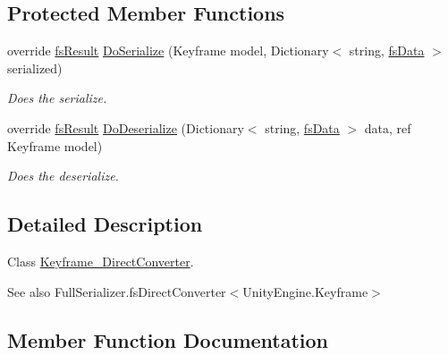 \subsection*{Protected Member Functions}
\begin{DoxyCompactItemize}
\item 
override \hyperlink{struct_full_serializer_1_1fs_result}{fs\+Result} \hyperlink{class_full_serializer_1_1_internal_1_1_direct_converters_1_1_keyframe___direct_converter_af16890a5241dfeb04a749245f64dd859}{Do\+Serialize} (Keyframe model, Dictionary$<$ string, \hyperlink{class_full_serializer_1_1fs_data}{fs\+Data} $>$ serialized)
\begin{DoxyCompactList}\small\item\em Does the serialize. \end{DoxyCompactList}\item 
override \hyperlink{struct_full_serializer_1_1fs_result}{fs\+Result} \hyperlink{class_full_serializer_1_1_internal_1_1_direct_converters_1_1_keyframe___direct_converter_a42df774ee6b28aa10dd727040969154b}{Do\+Deserialize} (Dictionary$<$ string, \hyperlink{class_full_serializer_1_1fs_data}{fs\+Data} $>$ data, ref Keyframe model)
\begin{DoxyCompactList}\small\item\em Does the deserialize. \end{DoxyCompactList}\end{DoxyCompactItemize}


\subsection{Detailed Description}
Class \hyperlink{class_full_serializer_1_1_internal_1_1_direct_converters_1_1_keyframe___direct_converter}{Keyframe\+\_\+\+Direct\+Converter}. 

\begin{DoxySeeAlso}{See also}
Full\+Serializer.\+fs\+Direct\+Converter$<$\+Unity\+Engine.\+Keyframe$>$


\end{DoxySeeAlso}


\subsection{Member Function Documentation}
\mbox{\label{class_full_serializer_1_1_internal_1_1_direct_converters_1_1_keyframe___direct_converter_aea3c4d54715cc2bc0d057c870916238b}} 
